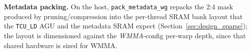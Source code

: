 \textbf{Metadata packing.} On the host, \texttt{pack\_metadata\_wg} repacks the 2:4 mask produced by pruning/compression into the per-thread SRAM bank layout that the \texttt{TCU\_LD} AGU and the metadata SRAM expect (Section~\ref{sec:design_sparse}); the layout is dimensioned against the \emph{WMMA}-config per-warp depth, since that shared hardware is sized for WMMA.

